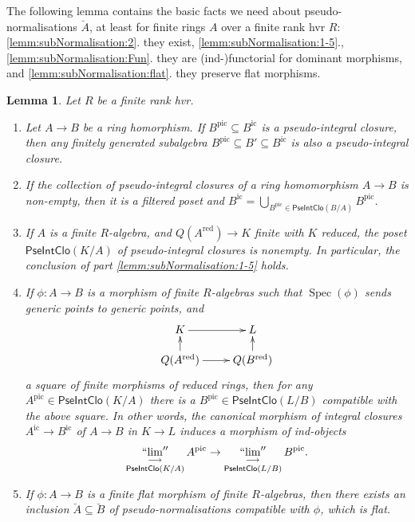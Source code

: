 \documentclass[10pt]{amsart}
\newtheorem{lemm}[theo]{Lemma}
\theoremstyle{definition}
\DeclareMathOperator{\Spec}{Spec}
\DeclareMathOperator{\ind}{``\underset{\longrightarrow}{lim}''}
\newcommand{\PN}{\mathsf{PseNor}}
\newcommand{\PIC}{\mathsf{PseIntClo}}
\newcommand{\red}{{\operatorname{red}}}
\newcommand{\ic}{{\operatorname{ic}}}
\newcommand{\pic}{{\operatorname{pic}}}
\begin{document}
The following lemma contains the basic facts we need about pseudo-normalisations $\breve{A}$, at least for finite rings $A$ over a finite rank hvr $R$: \ref{lemm:subNormalisation:2}. they exist, \ref{lemm:subNormalisation:1-5}., \ref{lemm:subNormalisation:Fun}. they are (ind-)functorial for dominant morphisms, and \ref{lemm:subNormalisation:flat}. they preserve flat morphisms.

\begin{lemm} \label{lemm:subNormalisation}
Let $R$ be a finite rank hvr. 
\begin{enumerate}
 \item \label{lemm:subNormalisation:1} Let $A \to B$ be a ring homorphism. If $B^\pic \subseteq B^\ic$ is a pseudo-integral closure, then any finitely generated subalgebra $B^\pic \subseteq B' \subseteq B^\ic$ is also a pseudo-integral closure.
 
 \item \label{lemm:subNormalisation:1-5} If the collection of pseudo-integral closures of a ring homomorphism $A {\to} B$ is non-empty, then it is a filtered poset and $B^\ic = \bigcup_{B^\pic \in \PIC(B/A)} B^\pic$.

 \item \label{lemm:subNormalisation:2} If $A$ is a finite $R$-algebra, and $Q(A^\red) \to K$ finite with $K$ reduced, the poset $\PIC(K/A)$ of pseudo-integral closures is nonempty. In particular, the conclusion of part \eqref{lemm:subNormalisation:1-5} holds. 
  
 \item \label{lemm:subNormalisation:Fun} If $\phi: A \to B$ is a morphism of finite $R$-algebras such that $\Spec(\phi)$ sends generic points to generic points, and 
\[ \xymatrix@R=12pt{
K \ar[r] & L \\
Q(A^\red) \ar[r] \ar[u] & Q(B^\red) \ar[u]
} \]
a square of finite morphisms of reduced rings, then for any $A^\pic \in \PIC(K/A)$ there is a $B^\pic \in \PIC(L/B)$ compatible with the above square. In other words, the canonical morphism of integral closures $A^\ic \to B^\ic$ of $A \to B$ in $K \to L$ induces a morphism of ind-objects 
\[ \ind_{\PIC(K/A)} A^\pic \to \ind_{\PIC(L/B)} B^\pic. \]

 \item \label{lemm:subNormalisation:flat} If $\phi: A \to B$ is a finite flat morphism of finite $R$-algebras, then there exists an inclusion $\breve{A} \subseteq \breve{B}$ of pseudo-normalisations compatible with $\phi$, which is flat.
\end{enumerate}
\end{lemm}
\end{document}
